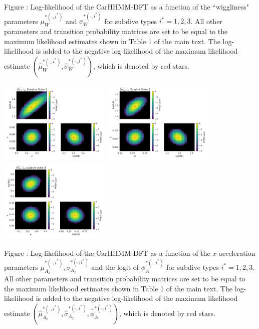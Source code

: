 \documentclass{article}
\begin{document}
        \noindent Figure : Log-likelihood of the CarHHMM-DFT as a function of the ``wiggliness" parameters $\mu_W^{*(\cdot,i^*)}$ and $\sigma_W^{*(\cdot,i^*)}$ for subdive types $i^* = 1,2,3$. All other parameters and transition probability matrices are set to be equal to the maximum likelihood estimates shown in Table 1 of the main text. The log-likelihood is added to the negative log-likelihood of the maximum likelihood estimate $(\hat \mu_W^{*(\cdot,i^*)}, \hat \sigma_W^{*(\cdot,i^*)})$, which is denoted by red stars.
        \addtocounter{fignum}{1}
        
        \newpage
        
        \begin{center}
        \includegraphics[width=2.1in]{../Plots/2019/20190902-182840-CATs_OB_1_0_267_CarHHMM2_fine-theta-likelihood-Ax-0.png}
        \includegraphics[width=2.1in]{../Plots/2019/20190902-182840-CATs_OB_1_0_267_CarHHMM2_fine-theta-likelihood-Ax-1.png}
        \includegraphics[width=2.1in]{../Plots/2019/20190902-182840-CATs_OB_1_0_267_CarHHMM2_fine-theta-likelihood-Ax-2.png}
        \end{center}
        
        \noindent Figure : Log-likelihood of the CarHHMM-DFT as a function of the $x$-acceleration parameters $\mu_{A_x}^{*(\cdot,i^*)}, \sigma_{A_x}^{*(\cdot,i^*)}$ and the logit of $\phi_{A}^{*(\cdot,i^*)}$ for subdive types $i^* = 1,2,3$. All other parameters and transition probability matrices are set to be equal to the maximum likelihood estimates shown in Table 1 of the main text. The log-likelihood is added to the negative log-likelihood of the maximum likelihood estimate $(\hat \mu_{A_x}^{*(\cdot,i^*)}, \hat \sigma_{A_x}^{*(\cdot,i^*)}, \hat \phi_{A}^{*(\cdot,i^*)})$, which is denoted by red stars.
        \addtocounter{fignum}{1}
        
\end{document}
